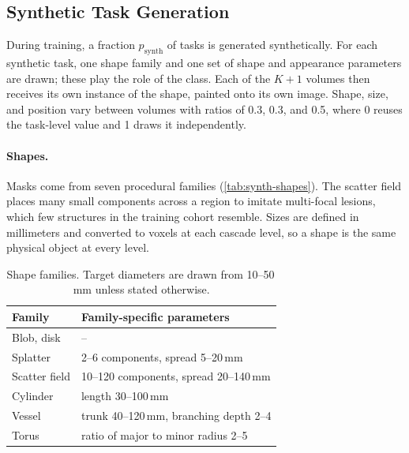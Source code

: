 \documentclass[hidelinks, a4paper, 12pt, ngerman, english]{article}  %
\begin{document}
\subsection{Synthetic Task Generation}\label{sec:methodology-synth}

During training, a fraction $p_{\text{synth}}$ of tasks is generated
synthetically. For each synthetic task, one shape family and one set of shape
and appearance parameters are drawn; these play the role of the class. Each of
the $K+1$ volumes then receives its own instance of the shape, painted onto its
own image. Shape, size, and position vary between volumes with ratios of 0.3,
0.3, and 0.5, where 0 reuses the task-level value and 1 draws it
independently.

\paragraph{Shapes.}
Masks come from seven procedural families (\autoref{tab:synth-shapes}). The
scatter field places many small components across a region to imitate
multi-focal lesions, which few structures in the training cohort resemble.
Sizes are defined in millimeters and converted to voxels at each cascade
level, so a shape is the same physical object at every level.

\begin{table}[t]
  \centering
  \small
  \caption{Shape families. Target diameters are drawn from 10--50\,mm unless
  stated otherwise.}
  \label{tab:synth-shapes}
  \begin{tabular}{@{}ll@{}}
    \toprule
    Family & Family-specific parameters \\
    \midrule
    Blob, disk      & -- \\
    Splatter        & 2--6 components, spread 5--20\,mm \\
    Scatter field   & 10--120 components, spread 20--140\,mm \\
    Cylinder        & length 30--100\,mm \\
    Vessel          & trunk 40--120\,mm, branching depth 2--4 \\
    Torus           & ratio of major to minor radius 2--5 \\
    \bottomrule
  \end{tabular}
\end{table}
\end{document}
